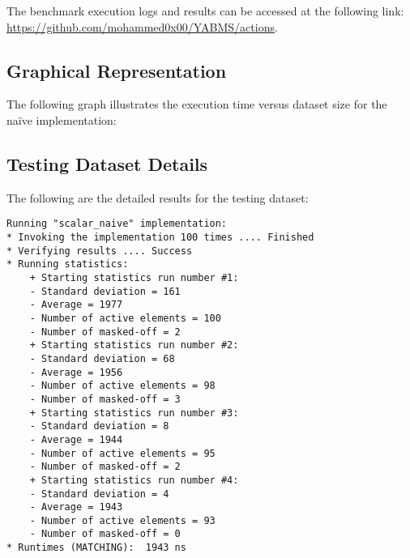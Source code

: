 \documentclass[12pt]{article}
\begin{document}
    The benchmark execution logs and results can be accessed at the following link: \url{https://github.com/mohammed0x00/YABMS/actions}.

    \newpage
\subsection{Graphical Representation}
The following graph illustrates the execution time versus dataset size for the naïve implementation:

    
\subsection{Testing Dataset Details}
The following are the detailed results for the testing dataset:
\begin{lstlisting}[caption=Testing Dataset Execution Details, style=customc]
Running "scalar_naive" implementation:
* Invoking the implementation 100 times .... Finished
* Verifying results .... Success
* Running statistics:
    + Starting statistics run number #1:
    - Standard deviation = 161
    - Average = 1977
    - Number of active elements = 100
    - Number of masked-off = 2
    + Starting statistics run number #2:
    - Standard deviation = 68
    - Average = 1956
    - Number of active elements = 98
    - Number of masked-off = 3
    + Starting statistics run number #3:
    - Standard deviation = 8
    - Average = 1944
    - Number of active elements = 95
    - Number of masked-off = 2
    + Starting statistics run number #4:
    - Standard deviation = 4
    - Average = 1943
    - Number of active elements = 93
    - Number of masked-off = 0
* Runtimes (MATCHING):  1943 ns
\end{lstlisting}
\end{document}
